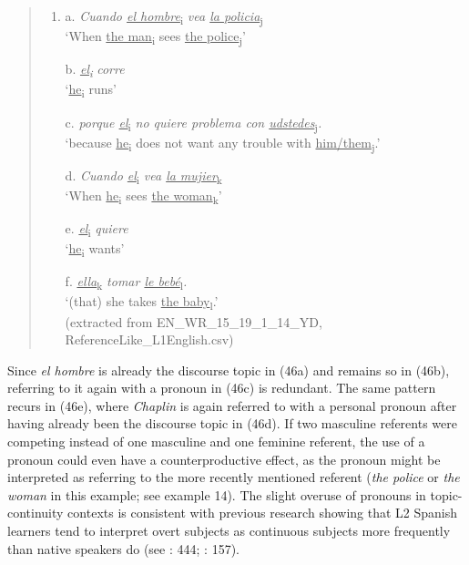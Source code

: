 \documentclass[
  letterpaper,
  DIV=11,
  numbers=noendperiod]{scrartcl}
\begin{document}
\begin{quote}
\begin{enumerate}
\def\labelenumi{\arabic{enumi}.}
\setcounter{enumi}{45}
\item
  a. \emph{Cuando \ul{el hombre}}\textsubscript{i} \emph{vea \ul{la
  policia}}\textsubscript{j}\\
  `When \ul{the man}\textsubscript{i} sees \ul{the
  police}\textsubscript{j}'

  b. \ul{\emph{el}}\textsubscript{\emph{i}} \emph{corre}\\
  `\ul{he}\textsubscript{i} runs'

  c. \emph{porque \ul{el}}\textsubscript{i} \emph{no quiere problema con
  \ul{udstedes}}\textsubscript{j}\emph{.}\\
  `because \ul{he}\textsubscript{i} does not want any trouble with
  \ul{him/them}\textsubscript{j}.'

  d. \emph{Cuando \ul{el}}\textsubscript{i} \emph{vea \ul{la
  mujier}}\textsubscript{k}\\
  `When \ul{he}\textsubscript{i} sees \ul{the woman}\textsubscript{k}'

  e. \ul{\emph{el}}\textsubscript{i} \emph{quiere}\\
  `\ul{he}\textsubscript{i} wants'

  f. \ul{\emph{ella}}\textsubscript{k} \emph{tomar \ul{le
  bebé}}\textsubscript{l}\emph{.}\\
  `(that) she takes \ul{the baby}\textsubscript{l}.'\\
  (extracted from EN\_WR\_15\_19\_1\_14\_YD,
  ReferenceLike\_L1English.csv)
\end{enumerate}
\end{quote}

Since \emph{el hombre} is already the discourse topic in (46a) and
remains so in (46b), referring to it again with a pronoun in (46c) is
redundant. The same pattern recurs in (46e), where \emph{Chaplin} is
again referred to with a personal pronoun after having already been the
discourse topic in (46d). If two masculine referents were competing
instead of one masculine and one feminine referent, the use of a pronoun
could even have a counterproductive effect, as the pronoun might be
interpreted as referring to the more recently mentioned referent
(\emph{the police} or \emph{the woman} in this example; see example 14).
The slight overuse of pronouns in topic-continuity contexts is
consistent with previous research showing that L2 Spanish learners tend
to interpret overt subjects as continuous subjects more frequently than
native speakers do (see
: 444; : 157).
\end{document}
